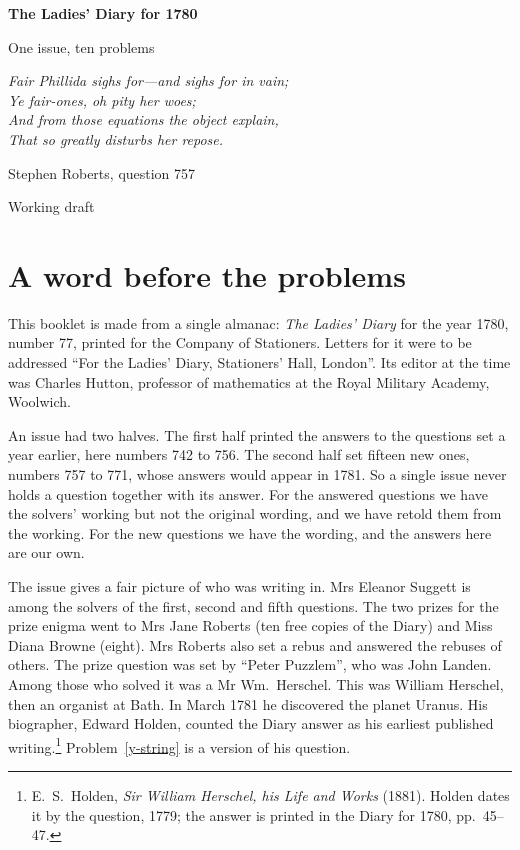 \documentclass[11pt,a4paper]{article}
\newcounter{prob}
\begin{document}
\begin{titlepage}
\centering
\vspace*{3cm}
{\Huge\bfseries The Ladies' Diary for 1780\par}
\vspace{0.6cm}
{\Large One issue, ten problems\par}
\vspace{2cm}
{\large\itshape Fair Phillida sighs for---and sighs for in vain;\\
Ye fair-ones, oh pity her woes;\\
And from those equations the object explain,\\
That so greatly disturbs her repose.\par}
\vspace{0.3cm}
{\small Stephen Roberts, question 757\par}
\vfill
{\large Working draft\par}
\end{titlepage}

\section*{A word before the problems}

This booklet is made from a single almanac: \textit{The Ladies' Diary} for the year 1780,
number 77, printed for the Company of Stationers. Letters for it were to be addressed
``For the Ladies' Diary, Stationers' Hall, London''. Its editor at the time was Charles
Hutton, professor of mathematics at the Royal Military Academy, Woolwich.

An issue had two halves. The first half printed the answers to the questions set a year
earlier, here numbers 742 to 756. The second half set fifteen new ones, numbers 757 to
771, whose answers would appear in 1781. So a single issue never holds a question
together with its answer. For the answered questions we have the solvers' working but
not the original wording, and we have retold them from the working. For the new questions
we have the wording, and the answers here are our own.

The issue gives a fair picture of who was writing in. Mrs Eleanor Suggett is among the
solvers of the first, second and fifth questions. The two prizes for the prize enigma went
to Mrs Jane Roberts (ten free copies of the Diary) and Miss Diana Browne (eight). Mrs
Roberts also set a rebus and answered the rebuses of others. The prize question was set
by ``Peter Puzzlem'', who was John Landen. Among those who solved it was a Mr Wm.\
Herschel. This was William Herschel, then an organist at Bath. In March 1781 he
discovered the planet Uranus. His biographer, Edward Holden, counted the Diary answer as
his earliest published writing.\footnote{E.~S.~Holden, \textit{Sir William Herschel, his
Life and Works} (1881). Holden dates it by the question, 1779; the answer is printed in
the Diary for 1780, pp.~45--47.} Problem~\ref{y-string} is a version of his question.
\end{document}
